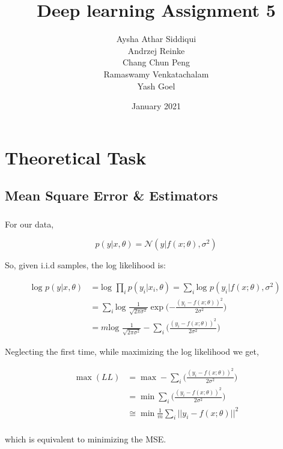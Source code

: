 \documentclass{article}
\title{Deep learning Assignment 5}
\author{Aysha Athar Siddiqui\\
Andrzej Reinke\\
Chang Chun Peng\\
Ramaswamy Venkatachalam\\
Yash Goel
}
\date{January 2021}
\begin{document}
\maketitle
\section{Theoretical Task }

\subsection{Mean Square Error \& Estimators}
\subsubsection{}
For our data,

\begin{equation*}
    p(y|x,\theta) = \mathcal{N}(y|f(x;\theta), \sigma^2)
\end{equation*}

So, given i.i.d samples, the log likelihood is:

\begin{align*}
    \text{log } p(y|x,\theta) &= \text{log } \prod_{i} p(y_{i}|x_{i},\theta) = \sum_{i}\text{log }p(y_{i}|f(x;\theta), \sigma^2)\\
    &= \sum_{i}\text{log }\frac{1}{\sqrt{2\pi\sigma^{2}}}\exp\Big({-\frac{(y_{i} - f(x;\theta))^{2}}{2\sigma^{2}}}\Big)\\
    &= m\text{log }\frac{1}{\sqrt{2\pi\sigma^{2}}} - \sum_{i}\Big({\frac{(y_{i} - f(x;\theta))^{2}}{2\sigma^{2}}}\Big)
\end{align*}

Neglecting the first time, while maximizing the log likelihood we get,

\begin{align*}
    \max (LL) &= \max - \sum_{i}\Big({\frac{(y_{i} - f(x;\theta))^{2}}{2\sigma^{2}}}\Big)\\
    &= \min \sum_{i}\Big({\frac{(y_{i} - f(x;\theta))^{2}}{2\sigma^{2}}}\Big)\\
    & \cong \min \frac{1}{m}\sum_{i}{||y_{i} - f(x;\theta)||^2}\\
\end{align*}

which is equivalent to minimizing the MSE.

\subsubsection{}
\end{document}
